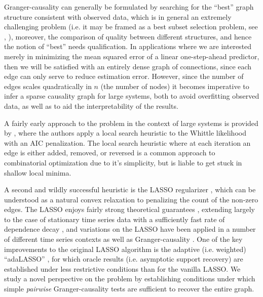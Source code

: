 \documentclass{statsoc}
\begin{document}
Granger-causality can generally be formulated by searching for the
``best'' graph structure consistent with observed data, which is in
general an extremely challenging problem (i.e. it may be framed as a
best subset selection problem, see \cite{bss_mio},
\cite{hastie_bss_comp}), moreover, the comparison of quality between
different structures, and hence the notion of ``best'' needs
qualification.  In applications where we are interested merely in
minimizing the mean squared error of a linear one-step-ahead
predictor, then we will be satisfied with an entirely dense graph of
connections, since each edge can only serve to reduce estimation
error.  However, since the number of edges scales quadratically in $n$
(the number of nodes) it becomes imperative to infer a sparse
causality graph for large systems, both to avoid overfitting observed
data, as well as to aid the interpretability of the results.

A fairly early approach to the problem in the context of large systems
is provided by \cite{bach2004learning}, where the authors apply a
local search heuristic to the Whittle likelihood with an AIC
penalization.  The local search heuristic where at each iteration an
edge is either added, removed, or reversed is a common approach to
combinatorial optimization due to it's simplicity, but is liable to
get stuck in shallow local minima.

A second and wildly successful heuristic is the LASSO regularizer
\cite{tibshirani1996regression}, which can be understood as a natural
convex relaxation to penalizing the count of the non-zero edges.  The
LASSO enjoys fairly strong theoretical guarantees
\cite{wainwright2009sharp}, extending largely to the case of
stationary time series data with a sufficiently fast rate of
dependence decay \cite{basu2015} \cite{wong2016lasso}
\cite{autoregressive_process_modelling_via_the_lasso_procedure}, and
variations on the LASSO have been applied in a number of different
time series contexts as well as Granger-causality
\cite{DBLP:journals/corr/HallacPBL17} \cite{haufe2008sparse}
\cite{bolstad2011causal} \cite{he2013stationary}
\cite{grouped_graphical_granger_modelling_for_gene_expression_regulatory_networks_discovery}.
One of the key improvements to the original LASSO algorithm is the
adaptive (i.e. weighted) ``adaLASSO'' \cite{adaptive_lasso_zou2006},
for which oracle results (i.e. asymptotic support recovery) are
established under less restrictive conditions than for the vanilla
LASSO.  We study a novel perspective on the problem by establishing
conditions under which simple \textit{pairwise} Granger-causality
tests are sufficient to recover the entire graph.
\end{document}
